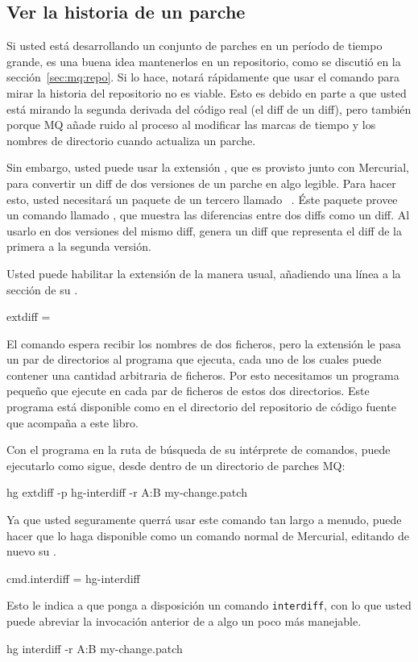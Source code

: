 \subsection{Ver la historia de un parche}
\label{mq-collab:tips:interdiff}

Si usted está desarrollando un conjunto de parches en un período de
tiempo grande, es una buena idea mantenerlos en un repositorio, como
se discutió en la sección~\ref{sec:mq:repo}.  Si lo hace, notará
rápidamente que usar el comando  para mirar la historia
del repositorio no es viable. Esto es debido en parte a que usted está
mirando la segunda derivada del código real (el diff de un diff), pero
también porque MQ añade ruido al proceso al modificar las marcas de
tiempo y los nombres de directorio cuando actualiza un parche.

Sin embargo, usted puede usar la extensión , que es
provisto junto con Mercurial, para convertir un diff de dos versiones
de un parche en algo legible. Para hacer esto, usted necesitará un
paquete de un tercero llamado
~\cite{web:patchutils}.  Éste paquete provee un
comando llamado , que muestra las diferencias entre
dos diffs como un diff. Al usarlo en dos versiones del mismo diff,
genera un diff que representa el diff de la primera a la segunda
versión.

Usted puede habilitar la extensión  de la manera usual,
añadiendo una línea a la sección  de su \hgrc.
\begin{codesample2}
  [extensions]
  extdiff =
\end{codesample2}
El comando   espera recibir los nombres de dos
ficheros, pero la extensión  le pasa un par de
directorios al programa que ejecuta, cada uno de los cuales puede
contener una cantidad arbitraria de ficheros. Por esto necesitamos un
programa pequeño que ejecute  en cada par de
ficheros de estos dos directorios. Este programa está disponible como
 en el directorio  del
repositorio de código fuente que acompaña a este libro.

Con el programa  en la ruta de búsqueda de su
intérprete de comandos, puede ejecutarlo como sigue, desde dentro de
un directorio de parches MQ:
\begin{codesample2}
  hg extdiff -p hg-interdiff -r A:B my-change.patch
\end{codesample2}
Ya que usted seguramente querrá usar este comando tan largo a menudo,
puede hacer que  lo haga disponible como un comando
normal de Mercurial, editando de nuevo su \hgrc.
\begin{codesample2}
  [extdiff]
  cmd.interdiff = hg-interdiff
\end{codesample2}
Esto le indica a  que ponga a disposición un comando
\texttt{interdiff}, con lo que usted puede abreviar la invocación
anterior de  a algo un poco más manejable.
\begin{codesample2}
  hg interdiff -r A:B my-change.patch
\end{codesample2}

